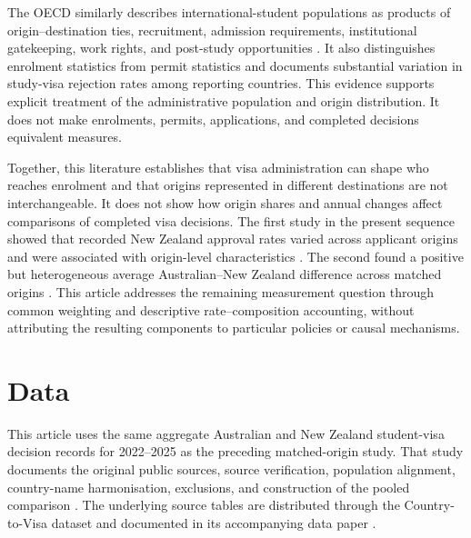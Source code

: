 \documentclass[runningheads]{llncs}
\begin{document}
The OECD similarly describes international-student populations as products of origin--destination ties, recruitment, admission requirements, institutional gatekeeping, work rights, and post-study opportunities \cite{OECD2022InternationalMigrationOutlook}. It also distinguishes enrolment statistics from permit statistics and documents substantial variation in study-visa rejection rates among reporting countries. This evidence supports explicit treatment of the administrative population and origin distribution. It does not make enrolments, permits, applications, and completed decisions equivalent measures.

Together, this literature establishes that visa administration can shape who reaches enrolment and that origins represented in different destinations are not interchangeable. It does not show how origin shares and annual changes affect comparisons of completed visa decisions. The first study in the present sequence showed that recorded New Zealand approval rates varied across applicant origins and were associated with origin-level characteristics \cite{Kaplan2026NZVisaApproval}. The second found a positive but heterogeneous average Australian--New Zealand difference across matched origins \cite{Kaplan2026AUNZDecisionOutcomes}. This article addresses the remaining measurement question through common weighting and descriptive rate--composition accounting, without attributing the resulting components to particular policies or causal mechanisms.

\section{Data}

This article uses the same aggregate Australian and New Zealand student-visa decision records for 2022--2025 as the preceding matched-origin study. That study documents the original public sources, source verification, population alignment, country-name harmonisation, exclusions, and construction of the pooled comparison \cite{Kaplan2026AUNZDecisionOutcomes}. The underlying source tables are distributed through the Country-to-Visa dataset and documented in its accompanying data paper \cite{Kaplan2026CountryToVisaDataset,Kaplan2026CrossNationalDataPaper}.
\end{document}
